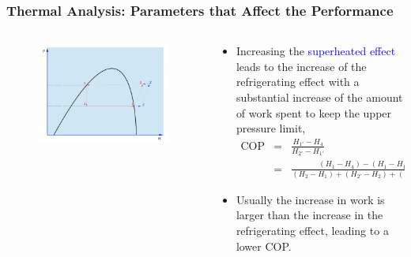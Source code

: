 \documentclass[10pt,compress]{beamer}
\newcommand{\frc}{\displaystyle\frac}
\begin{document}
\begin{frame}
 \frametitle{Thermal Analysis: Parameters that Affect the Performance}
 \begin{columns}
  \begin{column}[c]{0.3\linewidth}
   \begin{figure}%
      \includegraphics[width=4.cm,height=4.cm,clip]{./Pics/Overview_Refrig22}
   \end{figure}  
  \end{column}  
  \begin{column}[c]{0.7\linewidth}
   \begin{itemize}
    \item <1-> Increasing the \textcolor{blue}{superheated effect} leads to the increase of the refrigerating effect with a substantial increase of the amount of work spent to keep the upper pressure limit,
     \begin{eqnarray}
      \text{COP}&=&\frc{H_{1'}-H_{4}}{H_{2'}-H_{1'}} \nonumber \\
                                  &=& \frc{\left(H_{1}-H_{4}\right)-\left(H_{1}-H_{1'}\right)}{\left(H_{2}-H_{1}\right)+\left(H_{2'}-H_{2}\right)+\left(H_{1}-H_{1'}\right)} \nonumber 
     \end{eqnarray} 
    \item <2-> Usually the increase in work is larger than the increase in the refrigerating effect, leading to a lower COP.
   \end{itemize}
  \end{column}  
 \end{columns}
\end{frame}
\end{document}
